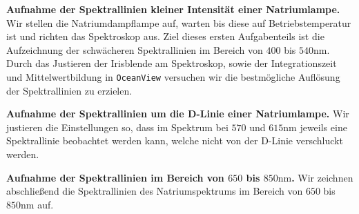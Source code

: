 \textbf{Aufnahme der Spektrallinien kleiner Intensität einer Natriumlampe.} Wir stellen die Natriumdampflampe auf, warten bis diese auf Betriebstemperatur ist und richten das Spektroskop aus. Ziel dieses ersten Aufgabenteils ist die Aufzeichnung der schwächeren Spektrallinien im Bereich von $400$ bis $540 \si{\nano\meter}$. Durch das Justieren der Irisblende am Spektroskop, sowie der Integrationszeit und Mittelwertbildung in \texttt{OceanView} versuchen wir die bestmögliche Auflösung der Spektrallinien zu erzielen.

\textbf{Aufnahme der Spektrallinien um die D-Linie einer Natriumlampe.} Wir justieren die Einstellungen so, dass im Spektrum bei $570$ und $615 \si{\nano\meter}$ jeweils eine Spektrallinie beobachtet werden kann, welche nicht von der D-Linie verschluckt werden.

\textbf{Aufnahme der Spektrallinien im Bereich von $650$ bis $850\si{\nano\meter}$.} Wir zeichnen abschließend die Spektrallinien des Natriumspektrums im Bereich von $650$ bis $850\si{\nano\meter}$ auf. 